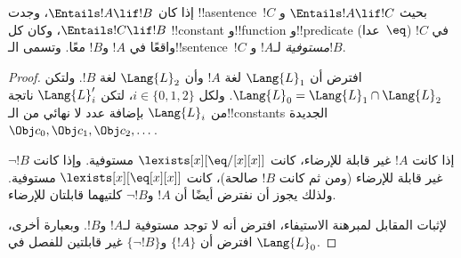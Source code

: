 \documentclass[../../../include/open-logic-section]{subfiles}
\begin{document}


\begin{thm}
إذا كان $\Entails !A \lif !B$، وجدت !!a{sentence}~$!C$ بحيث
$\Entails !A \lif !C$ و$\Entails !C \lif !B$، وكان كل !!{constant}
و!!{function} و!!{predicate} (عدا~$\eq$) في $!C$ واقعًا في $!A$ و$!B$
معًا. وتسمى الـ!!{sentence}~$!C$ \emph{مستوفية} لـ$!A$ و$!B$.
\end{thm}

\begin{proof}
افترض أن $\Lang{L}_1$ لغة $!A$ وأن $\Lang{L}_2$ لغة $!B$. ولتكن
$\Lang{L}_0 = \Lang{L}_1 \cap \Lang{L}_2$. ولكل
$i \in \{0,1,2\}$، لتكن $\Lang{L}'_i$ ناتجة من $\Lang{L}_i$ بإضافة
عدد لا نهائي من الـ!!{constant}s الجديدة
$\Obj c_0, \Obj c_1, \Obj c_2, \dots$.

إذا كانت $!A$ غير قابلة للإرضاء، كانت
$\lexists[x][\eq/[x][x]]$ مستوفية. وإذا كانت $\lnot !B$ غير قابلة
للإرضاء (ومن ثم كانت $!B$ صالحة)، كانت
$\lexists[x][\eq[x][x]]$ مستوفية. ولذلك يجوز أن نفترض أيضًا أن $!A$
و$\lnot !B$ كلتيهما قابلتان للإرضاء.

لإثبات المقابل لمبرهنة الاستيفاء، افترض أنه لا توجد مستوفية لـ$!A$
و$!B$. وبعبارة أخرى، افترض أن $\{!A\}$ و$\{\lnot !B\}$ غير قابلتين
للفصل في $\Lang{L}_0$.


\end{proof}
\end{document}
